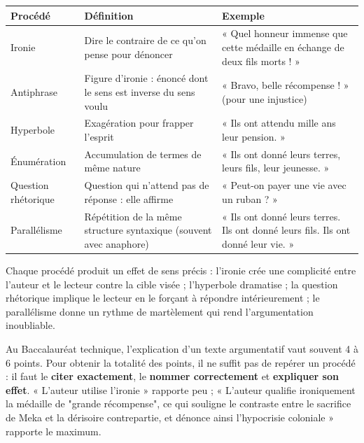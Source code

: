 \documentclass[11pt]{article}
\newcommand{\cle}[1]{{\popxbold\color{popdark}#1}}
\begin{document}
\begin{center}
\begin{tabularx}{\linewidth}{|l|X|X|}
\hline
\rowcolor{popblueL} \textbf{Procédé} & \textbf{Définition} & \textbf{Exemple} \\
\hline
\cle{Ironie} & Dire le contraire de ce qu'on pense pour dénoncer & « Quel honneur immense que cette médaille en échange de deux fils morts ! » \\
\hline
\cle{Antiphrase} & Figure d'ironie : énoncé dont le sens est inverse du sens voulu & « Bravo, belle récompense ! » (pour une injustice) \\
\hline
\cle{Hyperbole} & Exagération pour frapper l'esprit & « Ils ont attendu mille ans leur pension. » \\
\hline
\cle{Énumération} & Accumulation de termes de même nature & « Ils ont donné leurs terres, leurs fils, leur jeunesse. » \\
\hline
\cle{Question rhétorique} & Question qui n'attend pas de réponse : elle affirme & « Peut-on payer une vie avec un ruban ? » \\
\hline
\cle{Parallélisme} & Répétition de la même structure syntaxique (souvent avec anaphore) & « Ils ont donné leurs terres. Ils ont donné leurs fils. Ils ont donné leur vie. » \\
\hline
\end{tabularx}
\end{center}

Chaque procédé produit un \cle{effet de sens} précis : l'ironie crée une complicité entre l'auteur et le lecteur contre la cible visée ; l'hyperbole dramatise ; la question rhétorique implique le lecteur en le forçant à répondre intérieurement ; le parallélisme donne un rythme de martèlement qui rend l'argumentation inoubliable.

\begin{exemplebox}
Au Baccalauréat technique, l'explication d'un texte argumentatif vaut souvent 4 à 6 points. Pour obtenir la totalité des points, il ne suffit pas de repérer un procédé : il faut le \textbf{citer exactement}, le \textbf{nommer correctement} et \textbf{expliquer son effet}. « L'auteur utilise l'ironie » rapporte peu ; « L'auteur qualifie ironiquement la médaille de "grande récompense", ce qui souligne le contraste entre le sacrifice de Meka et la dérisoire contrepartie, et dénonce ainsi l'hypocrisie coloniale » rapporte le maximum.
\end{exemplebox}
\end{document}
